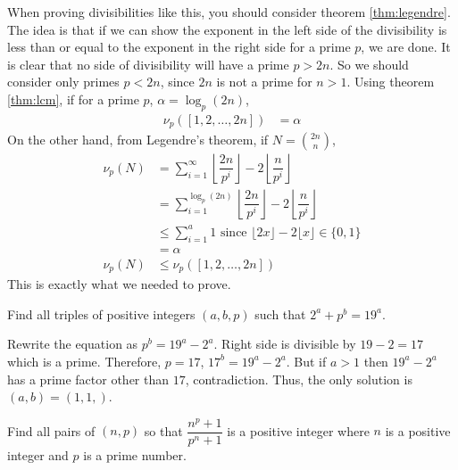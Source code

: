 \documentclass[problems.tex]{subfile}
\begin{document}
	\begin{solution}
		When proving divisibilities like this, you should consider theorem \eqref{thm:legendre}. The idea is that if we can show the exponent in the left side of the divisibility is less than or equal to the exponent in the right side for a prime $p$, we are done. It is clear that no side of divisibility will have a prime $p>2n$. So we should consider only primes $p<2n$, since $2n$ is not a prime for $n>1$. Using theorem \eqref{thm:lcm}, if for a prime $p$, $\alpha =\log_p(2n)$,
			\begin{align*}
				\nu_p([1,2,\ldots,2n]) & = \alpha
			\end{align*}
		On the other hand, from Legendre's theorem, if $N=\binom{2n}n$,
			\begin{align*}
				\nu_p(N) & = \sum_{i=1}^{\infty}\left\lfloor\dfrac{2n}{p^i}\right\rfloor-2\left\lfloor\dfrac{n}{p^i}\right\rfloor\\
						 & = \sum_{i=1}^{\log_{p}(2n)}\left\lfloor\dfrac{2n}{p^i}\right\rfloor-2\left\lfloor\dfrac{n}{p^i}\right\rfloor\\
						 &\leq\sum_{i=1}^{a}1\text { since }\lfloor2x\rfloor-2\lfloor x\rfloor\in\{0,1\}\\
						 & = \alpha \\
				\nu_p(N) &\leq\nu_p([1,2,\ldots,2n])
			\end{align*}
		This is exactly what we needed to prove.
	\end{solution}
	
	\begin{problem}
		Find all triples of positive integers $(a, b, p)$ such that $2^a+p^b=19^a$.
	\end{problem}
	
	\begin{solution}
		Rewrite the equation as $p^b=19^a-2^a$. Right side is divisible by $19-2=17$ which is a prime. Therefore, $p=17$, $17^b=19^a-2^a$. But if $a>1$ then $19^a-2^a$ has a prime factor other than $17$, contradiction. Thus, the only solution is $(a,b)=(1,1,)$.
	\end{solution}
	
	
	\begin{problem}
		Find all pairs of $(n, p)$ so that $\dfrac{n^p+1}{p^n+1}$ is a positive integer where $n$ is a positive integer and $p$ is a prime number.
	\end{problem}
	
\end{document}

